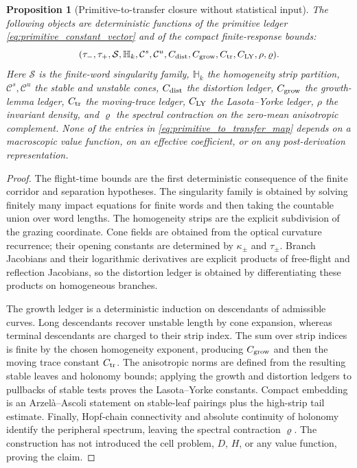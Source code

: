 \documentclass[12pt, letterpaper]{amsart}
\theoremstyle{plain}
\newtheorem{proposition}[theorem]{Proposition}
\theoremstyle{definition}
\theoremstyle{remark}
\begin{document}
\begin{proposition}[Primitive-to-transfer closure without statistical input]
\label{prop:primitive_to_transfer_closure_strengthened}
The following objects are deterministic functions of the primitive ledger
\eqref{eq:primitive_constant_vector} and of the compact finite-response bounds:
\begin{equation}
\label{eq:primitive_to_transfer_map}
    (\tau_-,\tau_+,\mathcal S,\mathbb H_k,\mathcal C^s,\mathcal C^u,
      C_{\rm dist},C_{\rm grow},C_{\rm tr},C_{\rm LY},\rho,\varrho).
\end{equation}
Here $\mathcal S$ is the finite-word singularity family, $\mathbb H_k$ the
homogeneity strip partition, $\mathcal C^s,\mathcal C^u$ the stable and unstable
cones, $C_{\rm dist}$ the distortion ledger, $C_{\rm grow}$ the growth-lemma
ledger, $C_{\rm tr}$ the moving-trace ledger, $C_{\rm LY}$ the Lasota--Yorke
ledger, $\rho$ the invariant density, and $\varrho$ the spectral contraction on
the zero-mean anisotropic complement.  None of the entries in
\eqref{eq:primitive_to_transfer_map} depends on a macroscopic value function,
on an effective coefficient, or on any post-derivation representation.
\end{proposition}

\begin{proof}
The flight-time bounds are the first deterministic consequence of the finite
corridor and separation hypotheses.  The singularity family is obtained by
solving finitely many impact equations for finite words and then taking the
countable union over word lengths.  The homogeneity strips are the explicit
subdivision of the grazing coordinate.  Cone fields are obtained from the
optical curvature recurrence; their opening constants are determined by
$\kappa_\pm$ and $\tau_\pm$.  Branch Jacobians and their logarithmic derivatives
are explicit products of free-flight and reflection Jacobians, so the distortion
ledger is obtained by differentiating these products on homogeneous branches.

The growth ledger is a deterministic induction on descendants of admissible
curves.  Long descendants recover unstable length by cone expansion, whereas
terminal descendants are charged to their strip index.  The sum over strip
indices is finite by the chosen homogeneity exponent, producing
$C_{\rm grow}$ and then the moving trace constant $C_{\rm tr}$.  The
anisotropic norms are defined from the resulting stable leaves and holonomy
bounds; applying the growth and distortion ledgers to pullbacks of stable tests
proves the Lasota--Yorke constants.  Compact embedding is an Arzel\`a--Ascoli
statement on stable-leaf pairings plus the high-strip tail estimate.  Finally,
Hopf-chain connectivity and absolute continuity of holonomy identify the
peripheral spectrum, leaving the spectral contraction $\varrho$.  The
construction has not introduced the cell problem, $D$, $H$, or any value
function, proving the claim.
\end{proof}
\end{document}
